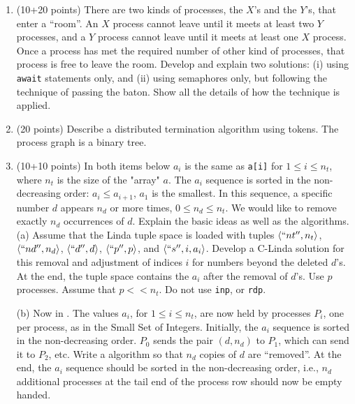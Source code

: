 \begin{enumerate}
\item (10+20 points) There are two kinds of processes, the $X$'s and the
$Y$'s, that enter a ``room''.  An $X$ process cannot leave until it
meets at least two $Y$ processes, and a $Y$ process cannot leave until
it meets at least one $X$ process.  Once a process has met the required
number of other kind of processes, that process is free to leave the
room.  Develop and explain two solutions: (i) using {\tt await}
statements only, and (ii) using semaphores only, but following the
technique of passing the baton.  Show all the details of how the
technique is applied. 

\item (20 points)
Describe a distributed termination algorithm using tokens.
The process graph is a binary tree.

\item (10+10 points) In both items below $a_i$ is the same as {\tt a[i]}
for $1 \le i \le n_t$, where $n_t$ is the size of the "array" $a$.  The
$a_i$ sequence is sorted in the non-decreasing order: $a_i \le a_{i+1}$,
$a_1$ is the smallest.  In this sequence, a specific number $d$ appears
$n_d$ or more times, $0 \le n_d \le n_t$.  We would like to remove
exactly $n_d$ occurrences of $d$.  Explain the basic ideas as well as
the algorithms.  \\

(a) Assume that the Linda tuple space is loaded with tuples $\langle ``nt'',
n_t \rangle$, $\langle ``nd'', n_d \rangle$, $\langle ``d'', d \rangle$, $\langle ``p'', p \rangle$,
and $\langle ``s'', i, a_i \rangle$.  Develop a C-Linda solution for this
removal and adjustment of indices $i$ for numbers beyond the deleted
$d$'s.  At the end, the tuple space contains the $a_i$ after the removal
of $d$'s.  Use $p$ processes.  Assume that $p << n_t$.  Do not use {\tt inp},
or {\tt rdp}.

(b) Now in \CSP.  The values $a_i$, for $1 \le i \le n_t$, are now held
by processes $P_i$, one per process, as in the Small Set of Integers.
Initially, the $a_i$ sequence is sorted in the non-decreasing order.
$P_0$ sends the pair $(d, n_d)$ to $P_1$, which can send it to $P_2$,
etc.  Write a \CSP algorithm so that $n_d$ copies of $d$ are
``removed''.  At the end, the $a_i$ sequence should be sorted in the
non-decreasing order, i.e., $n_d$ additional processes at the tail end
of the process row should now be empty handed. 

\end{enumerate}

